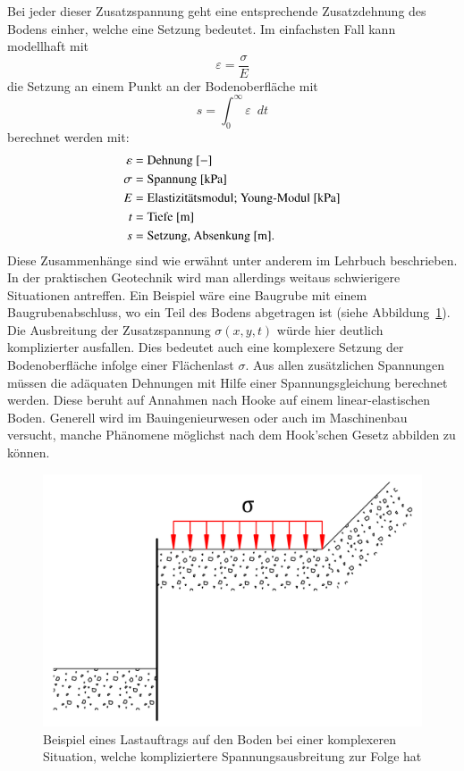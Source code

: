 Bei jeder dieser Zusatzspannung geht eine entsprechende Zusatzdehnung des Bodens einher, welche eine Setzung bedeutet.
Im einfachsten Fall kann modellhaft mit
\[
\varepsilon
=
\frac{\sigma}{E}
\]
die Setzung an einem Punkt an der Bodenoberfläche mit
\[
s
=
\int_{0}^{\infty}\varepsilon\enspace dt
\]
berechnet werden mit:
\begin{align*}
	\varepsilon &= \text{Dehnung [$-$]}                                     \\
	     \sigma &= \text{Spannung [\si{\kilo\pascal}]}                      \\
	          E &= \text{Elastizitätsmodul; Young-Modul [\si{\kilo\pascal}]}\\
	          t &= \text{Tiefe [\si{\meter}]}                               \\
	          s &= \text{Setzung, Absenkung [m].}
\end{align*}
Diese Zusammenhänge sind wie erwähnt unter anderem im  Lehrbuch \cite{spannung:Grundlagen-der-Geotechnik} beschrieben.
In der praktischen Geotechnik wird man allerdings weitaus schwierigere Situationen antreffen.
Ein Beispiel wäre eine Baugrube mit einem Baugrubenabschluss, wo ein Teil des Bodens abgetragen ist (siehe Abbildung~\ref{fig:Bild3}).
Die Ausbreitung der Zusatzspannung $\sigma(x,y,t)$ würde hier deutlich komplizierter ausfallen.
Dies bedeutet auch eine komplexere Setzung der Bodenoberfläche infolge einer Flächenlast $\sigma$.
Aus allen zusätzlichen Spannungen müssen die adäquaten Dehnungen mit Hilfe einer Spannungsgleichung berechnet werden.
Diese beruht auf Annahmen nach Hooke auf einem linear-elastischen Boden.
Generell wird im Bauingenieurwesen oder auch im Maschinenbau versucht, manche Phänomene möglichst nach dem Hook'schen Gesetz abbilden zu können.

\begin{figure}
	\centering
	\includegraphics[width=0.45\linewidth,keepaspectratio]{papers/spannung/Grafiken/Bild3.png}
	\caption{Beispiel eines Lastauftrags auf den Boden bei einer komplexeren Situation, welche kompliziertere Spannungsausbreitung zur Folge hat}
	\label{fig:Bild3}
\end{figure}
